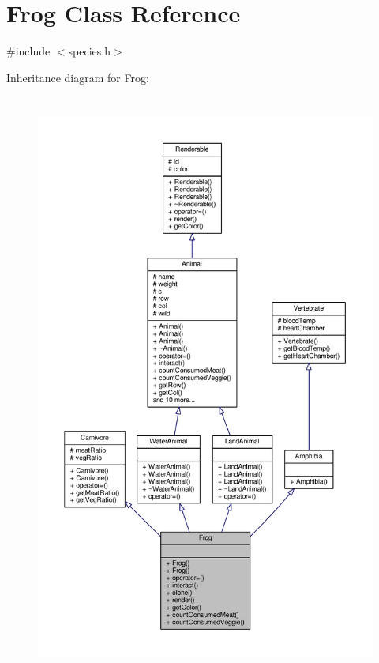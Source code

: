 \hypertarget{classFrog}{}\section{Frog Class Reference}
\label{classFrog}


{\ttfamily \#include $<$species.\+h$>$}



Inheritance diagram for Frog\+:
\nopagebreak
\begin{figure}[H]
\begin{center}
\leavevmode
\includegraphics[height=550pt]{classFrog__inherit__graph}
\end{center}
\end{figure}



